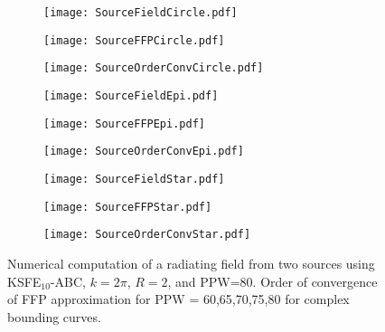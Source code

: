 \documentclass[final,3p,times,12pt]{elsarticle}
\begin{document}
\begin{figure}[!h]
\begin{subfigure}{0.35\textwidth}
\texttt{[image: SourceFieldCircle.pdf]} 
\end{subfigure}
\begin{subfigure}{0.3\textwidth}
\texttt{[image: SourceFFPCircle.pdf]}
\end{subfigure}
\begin{subfigure}{0.3\textwidth}
\texttt{[image: SourceOrderConvCircle.pdf]}
\end{subfigure}
\begin{subfigure}{0.35\textwidth}
\texttt{[image: SourceFieldEpi.pdf]} 
\end{subfigure}
\begin{subfigure}{0.3\textwidth}
\texttt{[image: SourceFFPEpi.pdf]}
\end{subfigure}
\hspace{0.1cm}
\begin{subfigure}{0.3\textwidth}
\texttt{[image: SourceOrderConvEpi.pdf]}
\end{subfigure}
\begin{subfigure}{0.35\textwidth}
\texttt{[image: SourceFieldStar.pdf]} 
\end{subfigure}
\hspace{0.2cm}
\begin{subfigure}{0.3\textwidth}
\texttt{[image: SourceFFPStar.pdf]}
\end{subfigure}
\hspace{0.2cm}
\begin{subfigure}{0.3\textwidth}
\texttt{[image: SourceOrderConvStar.pdf]}
\end{subfigure}
\vspace{-.7cm}
\caption{Numerical computation of a radiating field from two sources using KSFE$_{10}$-ABC, $k=2\pi$, $R=2$, and PPW=80. Order of convergence of FFP approximation for PPW = 60,65,70,75,80 for complex bounding curves.}
\label{fig:ComplexObstSources}
\end{figure}
\end{document}
